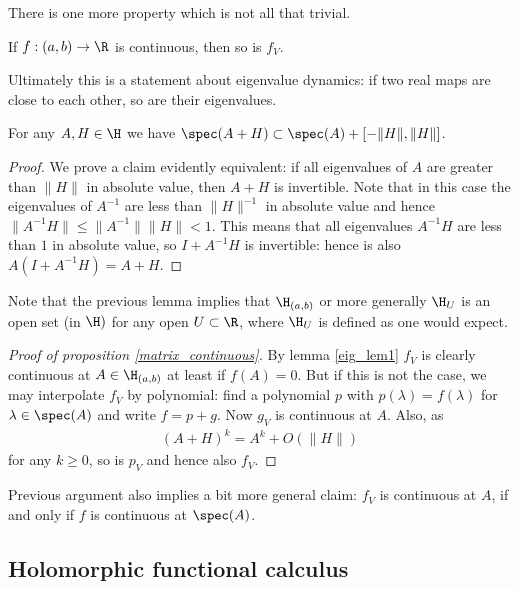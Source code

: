 There is one more property which is not all that trivial.

\begin{prop}\label{matrix_continuous}
	If $f : (a, b) \to \R$ is continuous, then so is $f_{V}$.
\end{prop}

Ultimately this is a statement about eigenvalue dynamics: if two real maps are close to each other, so are their eigenvalues.
\begin{lem}\label{eig_lem1}
	For any $A, H \in \H$ we have $\spec(A + H) \subset \spec(A) + [-\|H\|, \|H\|]$.
\end{lem}
\begin{proof}
	We prove a claim evidently equivalent: if all eigenvalues of $A$ are greater than $\|H\|$ in absolute value, then $A + H$ is invertible. Note that in this case the eigenvalues of $A^{-1}$ are less than $\|H\|^{-1}$ in absolute value and hence $\|A^{-1} H\| \leq \|A^{-1}\| \|H\| < 1$. This means that all eigenvalues $A^{-1} H$ are less than $1$ in absolute value, so $I + A^{-1} H$ is invertible: hence is also $A (I + A^{-1} H) = A + H$.
\end{proof}

Note that the previous lemma implies that $\H_{(a, b)}$ or more generally $\H_{U}$ is an open set (in $\H)$ for any open $U \subset \R$, where $\H_{U}$ is defined as one would expect.

\begin{proof}[Proof of proposition \ref{matrix_continuous}]
	By lemma \ref{eig_lem1} $f_{V}$ is clearly continuous at $A \in \H_{(a, b)}$ at least if $f(A) = 0$. But if this is not the case, we may interpolate $f_{V}$ by polynomial: find a polynomial $p$ with $p(\lambda) = f(\lambda)$ for $\lambda \in \spec(A)$ and write $f = p + g$. Now $g_{V}$ is continuous at $A$. Also, as
	\begin{align*}
		(A + H)^{k} = A^{k} + O(\|H\|)
	\end{align*}
	for any $k \geq 0$, so is $p_{V}$ and hence also $f_{V}$.
\end{proof}

Previous argument also implies a bit more general claim: $f_{V}$ is continuous at $A$, if and only if $f$ is continuous at $\spec(A)$.

\subsection{Holomorphic functional calculus}

